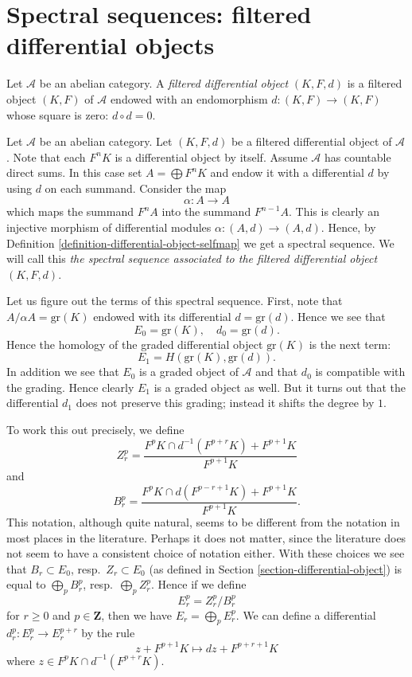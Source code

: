 \section{Spectral sequences: filtered differential objects}
\label{section-filtered-differential}

\begin{definition}
\label{definition-filtered-differential}
Let $\mathcal{A}$ be an abelian category.
A {\it filtered differential object} $(K, F, d)$ is a filtered object
$(K, F)$ of $\mathcal{A}$ endowed with an endomorphism
$d : (K, F) \to (K, F)$ whose square is zero: $d \circ d = 0$.
\end{definition}

\noindent
Let $\mathcal{A}$ be an abelian category.
Let $(K, F, d)$ be a filtered differential object of $\mathcal{A}$.
Note that each $F^nK$ is a differential object by itself.
Assume $\mathcal{A}$ has countable direct sums.
In this case set $A = \bigoplus F^nK$ and endow it with a differential
$d$ by using $d$ on each summand. Consider the map
$$
\alpha : A \to A
$$
which maps the summand $F^nA$ into the summand
$F^{n - 1}A$. This is clearly an injective morphism of differential
modules $\alpha : (A, d) \to (A, d)$. Hence, by
Definition \ref{definition-differential-object-selfmap}
we get a spectral sequence.
We will call this {\it the spectral sequence associated to
the filtered differential object $(K, F, d)$}.

\medskip\noindent
Let us figure out the terms of this spectral sequence.
First, note that $A/\alpha A = \text{gr}(K)$
endowed with its differential $d = \text{gr}(d)$. Hence we see that
$$
E_0 = \text{gr}(K), \quad d_0 = \text{gr}(d).
$$
Hence the homology of the graded differential object $\text{gr}(K)$
is the next term:
$$
E_1 = H(\text{gr}(K), \text{gr}(d)).
$$
In addition we see that $E_0$ is a graded object of $\mathcal{A}$
and that $d_0$ is compatible with the grading. Hence clearly $E_1$
is a graded object as well. But it turns out that the differential
$d_1$ does not preserve this grading; instead it shifts the degree by $1$.

\medskip\noindent
To work this out precisely, we define
$$
Z_r^p =
\frac{F^pK \cap d^{-1}(F^{p + r}K) + F^{p + 1}K}{F^{p + 1}K}
$$
and
$$
B_r^p =
\frac{F^pK \cap d(F^{p - r + 1}K) + F^{p + 1}K}{F^{p + 1}K}.
$$
This notation, although quite natural, seems to be different from the
notation in most places in the literature. Perhaps it does not matter,
since the literature does not seem to have a consistent choice of notation
either. With these choices we see that $B_r \subset E_0$,
resp.\ $Z_r \subset E_0$ (as defined in
Section \ref{section-differential-object}) is equal to
$\bigoplus_p B_r^p$, resp.\ $\bigoplus_p Z_r^p$.
Hence if we define
$$
E_r^p = Z_r^p/B_r^p
$$
for $r \geq 0$ and $p \in \mathbf{Z}$, then we have $E_r = \bigoplus_p E_r^p$.
We can define a differential $d_r^p : E_r^p \to E_r^{p + r}$
by the rule
$$
z + F^{p + 1}K
\longmapsto
dz + F^{p + r + 1}K
$$
where $z \in F^pK \cap d^{-1}(F^{p + r}K)$.

